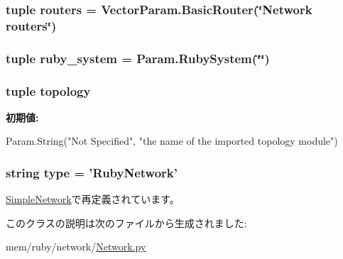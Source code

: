 \label{classNetwork_1_1RubyNetwork_a3a95fb4eb2b16f40b89c010572e72a54}
\hypertarget{classNetwork_1_1RubyNetwork_a97871b4dad4b2cfd7631d3b6186c76e4}{
\subsubsection[{routers}]{\setlength{\rightskip}{0pt plus 5cm}tuple {\bf routers} = VectorParam.BasicRouter(\char`\"{}Network {\bf routers}\char`\"{})}}
\label{classNetwork_1_1RubyNetwork_a97871b4dad4b2cfd7631d3b6186c76e4}
\hypertarget{classNetwork_1_1RubyNetwork_ad43d9de73a55aa43ab5023d7815d7286}{
\subsubsection[{ruby\_\-system}]{\setlength{\rightskip}{0pt plus 5cm}tuple {\bf ruby\_\-system} = Param.RubySystem(\char`\"{}\char`\"{})}}
\label{classNetwork_1_1RubyNetwork_ad43d9de73a55aa43ab5023d7815d7286}
\hypertarget{classNetwork_1_1RubyNetwork_a91275356bdab99969e72790d577ce8df}{
\subsubsection[{topology}]{\setlength{\rightskip}{0pt plus 5cm}tuple {\bf topology}}}
\label{classNetwork_1_1RubyNetwork_a91275356bdab99969e72790d577ce8df}
{\bfseries 初期値:}
\begin{DoxyCode}
Param.String("Not Specified",
                            "the name of the imported topology module")
\end{DoxyCode}
\hypertarget{classNetwork_1_1RubyNetwork_acce15679d830831b0bbe8ebc2a60b2ca}{
\subsubsection[{type}]{\setlength{\rightskip}{0pt plus 5cm}string {\bf type} = '{\bf RubyNetwork}'}}
\label{classNetwork_1_1RubyNetwork_acce15679d830831b0bbe8ebc2a60b2ca}


\hyperlink{classSimpleNetwork_1_1SimpleNetwork_acce15679d830831b0bbe8ebc2a60b2ca}{SimpleNetwork}で再定義されています。

このクラスの説明は次のファイルから生成されました:\begin{DoxyCompactItemize}
\item 
mem/ruby/network/\hyperlink{Network_8py}{Network.py}\end{DoxyCompactItemize}
